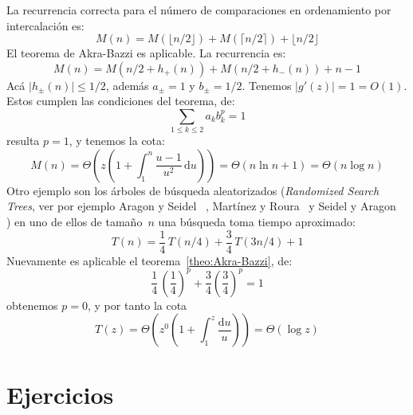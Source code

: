   La recurrencia correcta para el número de comparaciones
  en ordenamiento por intercalación es:
  \begin{equation*}
    M(n)
      = M(\lfloor n / 2 \rfloor) + M(\lceil n / 2 \rceil)
          + \lfloor n / 2 \rfloor
  \end{equation*}
  El teorema de Akra-Bazzi es aplicable.
  La recurrencia es:
  \begin{equation*}
    M(n)
      = M(n / 2 + h_{+}(n)) + M(n / 2 + h_{-}(n)) + n - 1
  \end{equation*}
  Acá \(\lvert h_{\pm}(n) \rvert \le 1/2\),
  además \(a_{\pm} = 1\) y \(b_{\pm} = 1/2\).
  Tenemos \(\lvert g'(z) \rvert = 1 = O(1)\).
  Estos cumplen las condiciones del teorema,
  de:
  \begin{equation*}
    \sum_{1 \le k \le 2} a_k b_k^p = 1
  \end{equation*}
  resulta \(p = 1\),
  y tenemos la cota:
  \begin{equation*}
    M(n)
      = \Theta
          \left(
            z \left(
          1 + \int_1^n \frac{u - 1}{u^2} \, \mathrm{d} u
              \right)
          \right)
      = \Theta
          \left(
            n \ln n + 1
          \right)
      = \Theta(n \log n)
  \end{equation*}
  Otro ejemplo son los árboles de búsqueda aleatorizados
  (\emph{\foreignlanguage{english}{Randomized Search Trees}},
   ver por ejemplo Aragon y Seidel~%
     \cite{aragon89:_random_search_tree},
   Martínez y Roura~%
     \cite{martinez98:_random_binar_searc_trees}
   y Seidel y Aragon~%
     \cite{seidel96:_random_search_trees})
  en uno de ellos de tamaño~\(n\)
  una búsqueda toma tiempo aproximado:
  \begin{equation*}
    T(n)
      = \frac{1}{4} \, T(n / 4) + \frac{3}{4} \, T(3 n / 4) + 1
  \end{equation*}
  Nuevamente es aplicable el teorema~\ref{theo:Akra-Bazzi},
  de:
  \begin{equation*}
    \frac{1}{4} \, \left(\frac{1}{4}\right)^p
        + \frac{3}{4} \left(\frac{3}{4}\right)^p
      = 1
  \end{equation*}
  obtenemos \(p = 0\),
  y por tanto la cota
  \begin{equation*}
    T(z)
      = \Theta \left(
          z^0 \left( 1 + \int_1^z \frac{\mathrm{d} u}{u} \right)
        \right)
      = \Theta ( \log z )
  \end{equation*}


\section*{Ejercicios}
\label{sec:ejercicios-16}

